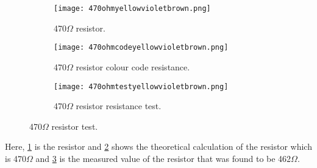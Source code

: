 \documentclass[a4paper, 14pt]{extarticle}
\begin{document}
            \vspace{3cm}
            
            \begin{figure}[htbp]
            \centering
                \begin{subfigure}[h]{0.3\textwidth}
                \centering
                    \texttt{[image: 470ohmyellowvioletbrown.png]}
                    \caption{470$\Omega$ resistor.}
                    \label{fig:subfig12}
                \end{subfigure}
                \hfill
                \begin{subfigure}[H]{0.3\textwidth}
                \centering
                    \texttt{[image: 470ohmcodeyellowvioletbrown.png]}
                    \caption{470$\Omega$ resistor colour code resistance.}
                    \label{fig:subfig13}
                \end{subfigure}
                \hfill
                \begin{subfigure}[h]{0.3\textwidth}
                \centering
                    \texttt{[image: 470ohmtestyellowvioletbrown.png]}
                    \caption{470$\Omega$ resistor resistance test.}
                    \label{fig:subfig14}
                \end{subfigure}
                \caption{470$\Omega$ resistor test.}
                \label{fig:mainfig5}
            \end{figure}
            Here, \ref{fig:subfig12} is the resistor and \ref{fig:subfig13} shows the theoretical calculation of the resistor which is 470$\Omega$ and \ref{fig:subfig14} is the measured value of the resistor that was found to be 462$\Omega$.

            \newpage
            
\end{document}
